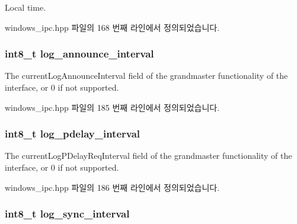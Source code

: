 Local time. 



windows\+\_\+ipc.\+hpp 파일의 168 번째 라인에서 정의되었습니다.

\subsubsection[{\texorpdfstring{log\+\_\+announce\+\_\+interval}{log_announce_interval}}]{\setlength{\rightskip}{0pt plus 5cm}int8\+\_\+t log\+\_\+announce\+\_\+interval\hspace{0.3cm}{\ttfamily [inherited]}}\hypertarget{class_offset_a15bb50a04ecd3ec11563012afc7e24a7}{}\label{class_offset_a15bb50a04ecd3ec11563012afc7e24a7}


The current\+Log\+Announce\+Interval field of the grandmaster functionality of the interface, or 0 if not supported. 



windows\+\_\+ipc.\+hpp 파일의 185 번째 라인에서 정의되었습니다.

\subsubsection[{\texorpdfstring{log\+\_\+pdelay\+\_\+interval}{log_pdelay_interval}}]{\setlength{\rightskip}{0pt plus 5cm}int8\+\_\+t log\+\_\+pdelay\+\_\+interval\hspace{0.3cm}{\ttfamily [inherited]}}\hypertarget{class_offset_a26544b553c0b251da8e632533f260a5d}{}\label{class_offset_a26544b553c0b251da8e632533f260a5d}


The current\+Log\+P\+Delay\+Req\+Interval field of the grandmaster functionality of the interface, or 0 if not supported. 



windows\+\_\+ipc.\+hpp 파일의 186 번째 라인에서 정의되었습니다.

\subsubsection[{\texorpdfstring{log\+\_\+sync\+\_\+interval}{log_sync_interval}}]{\setlength{\rightskip}{0pt plus 5cm}int8\+\_\+t log\+\_\+sync\+\_\+interval\hspace{0.3cm}{\ttfamily [inherited]}}\hypertarget{class_offset_a2d4950b4c6da4dfa67688dcaf6139c9d}{}\label{class_offset_a2d4950b4c6da4dfa67688dcaf6139c9d}


